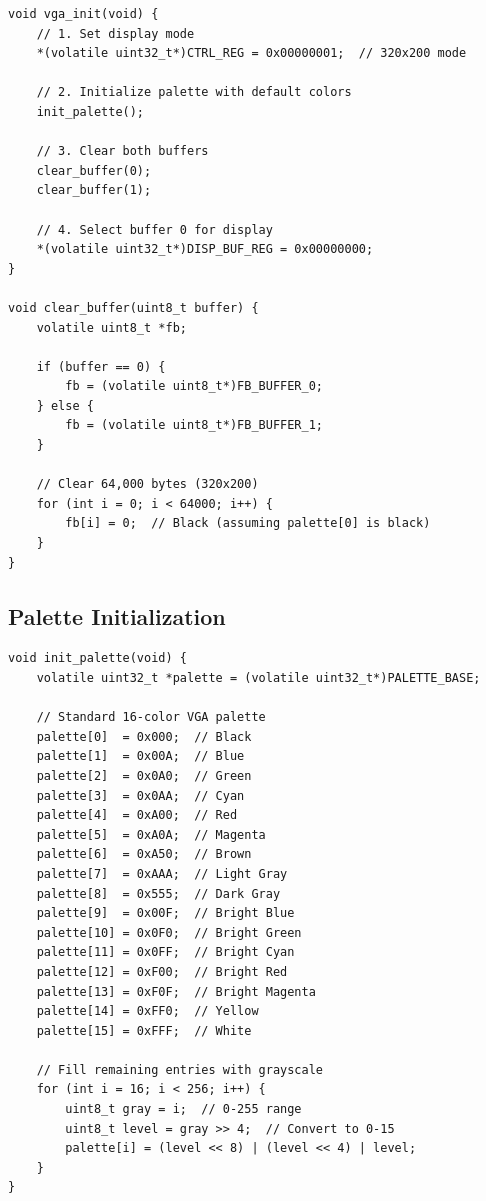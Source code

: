 \documentclass[11pt,letterpaper]{report}
\begin{document}
\begin{lstlisting}[style=c,caption={VGA Controller Initialization}]
void vga_init(void) {
    // 1. Set display mode
    *(volatile uint32_t*)CTRL_REG = 0x00000001;  // 320x200 mode
    
    // 2. Initialize palette with default colors
    init_palette();
    
    // 3. Clear both buffers
    clear_buffer(0);
    clear_buffer(1);
    
    // 4. Select buffer 0 for display
    *(volatile uint32_t*)DISP_BUF_REG = 0x00000000;
}

void clear_buffer(uint8_t buffer) {
    volatile uint8_t *fb;
    
    if (buffer == 0) {
        fb = (volatile uint8_t*)FB_BUFFER_0;
    } else {
        fb = (volatile uint8_t*)FB_BUFFER_1;
    }
    
    // Clear 64,000 bytes (320x200)
    for (int i = 0; i < 64000; i++) {
        fb[i] = 0;  // Black (assuming palette[0] is black)
    }
}
\end{lstlisting}

\subsection{Palette Initialization}

\begin{lstlisting}[style=c,caption={Standard VGA Palette Initialization}]
void init_palette(void) {
    volatile uint32_t *palette = (volatile uint32_t*)PALETTE_BASE;
    
    // Standard 16-color VGA palette
    palette[0]  = 0x000;  // Black
    palette[1]  = 0x00A;  // Blue
    palette[2]  = 0x0A0;  // Green
    palette[3]  = 0x0AA;  // Cyan
    palette[4]  = 0xA00;  // Red
    palette[5]  = 0xA0A;  // Magenta
    palette[6]  = 0xA50;  // Brown
    palette[7]  = 0xAAA;  // Light Gray
    palette[8]  = 0x555;  // Dark Gray
    palette[9]  = 0x00F;  // Bright Blue
    palette[10] = 0x0F0;  // Bright Green
    palette[11] = 0x0FF;  // Bright Cyan
    palette[12] = 0xF00;  // Bright Red
    palette[13] = 0xF0F;  // Bright Magenta
    palette[14] = 0xFF0;  // Yellow
    palette[15] = 0xFFF;  // White
    
    // Fill remaining entries with grayscale
    for (int i = 16; i < 256; i++) {
        uint8_t gray = i;  // 0-255 range
        uint8_t level = gray >> 4;  // Convert to 0-15
        palette[i] = (level << 8) | (level << 4) | level;
    }
}
\end{lstlisting}
\end{document}
